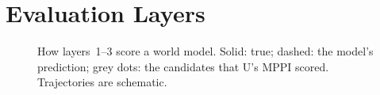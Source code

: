 \documentclass[conference]{IEEEtran}
\begin{document}
\section{Evaluation Layers}\label{sec:layers}
\begin{figure}[t]
\centering

\caption{How layers~1--3 score a world model. Solid: true; dashed: the model's prediction; grey dots: the candidates that U's MPPI scored. Trajectories are schematic.}
\label{fig:probes}
\end{figure}
\end{document}
